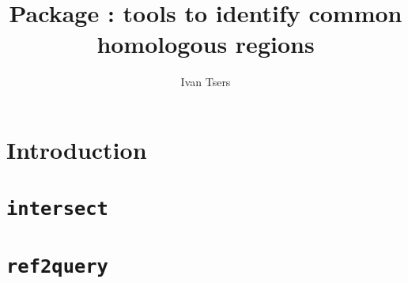 \documentclass[a4paper]{article}
\begin{document}
\pagestyle{noweb}

\title{Package : tools to identify common homologous regions}
\author{Ivan Tsers}
\maketitle
\tableofcontents

\section{Introduction}

\section{\texttt{intersect}}

\section{\texttt{ref2query}}

\end{document}
